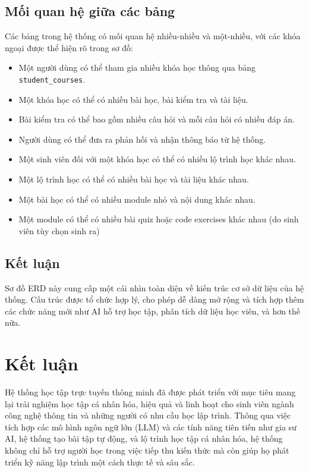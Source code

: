 \subsection{Mối quan hệ giữa các bảng}
Các bảng trong hệ thống có mối quan hệ nhiều-nhiều và một-nhiều, với các khóa ngoại được thể hiện rõ trong sơ đồ:
\begin{itemize}
    \item Một người dùng có thể tham gia nhiều khóa học thông qua bảng \texttt{student\_courses}.
    \item Một khóa học có thể có nhiều bài học, bài kiểm tra và tài liệu.
    \item Bài kiểm tra có thể bao gồm nhiều câu hỏi và mỗi câu hỏi có nhiều đáp án.
    \item Người dùng có thể đưa ra phản hồi và nhận thông báo từ hệ thống.
    \item Một sinh viên đối với một khóa học có thể có nhiều lộ trình học khác nhau. 
    \item Một lộ trình học có thể có nhiều bài học và tài liệu khác nhau.
    \item Một bài học có thể có nhiều module nhỏ và nội dung khác nhau.
    \item Một module có thể có nhiều bài quiz hoặc code exercises khác nhau (do sinh viên tùy chọn sinh ra)
\end{itemize}

\subsection{Kết luận}
Sơ đồ ERD này cung cấp một cái nhìn toàn diện về kiến trúc cơ sở dữ liệu của hệ thống. Cấu trúc được tổ chức hợp lý, cho phép dễ dàng mở rộng và tích hợp thêm các chức năng mới như AI hỗ trợ học tập, phân tích dữ liệu học viên, và hơn thế nữa.

\section{Kết luận}
Hệ thống học tập trực tuyến thông minh đã được phát triển với mục tiêu mang lại trải nghiệm học tập cá nhân hóa, hiệu quả và linh hoạt cho sinh viên ngành công nghệ thông tin và những người có nhu cầu học lập trình. Thông qua việc tích hợp các mô hình ngôn ngữ lớn (LLM) và các tính năng tiên tiến như gia sư AI, hệ thống tạo bài tập tự động, và lộ trình học tập cá nhân hóa, hệ thống không chỉ hỗ trợ người học trong việc tiếp thu kiến thức mà còn giúp họ phát triển kỹ năng lập trình một cách thực tế và sâu sắc.

